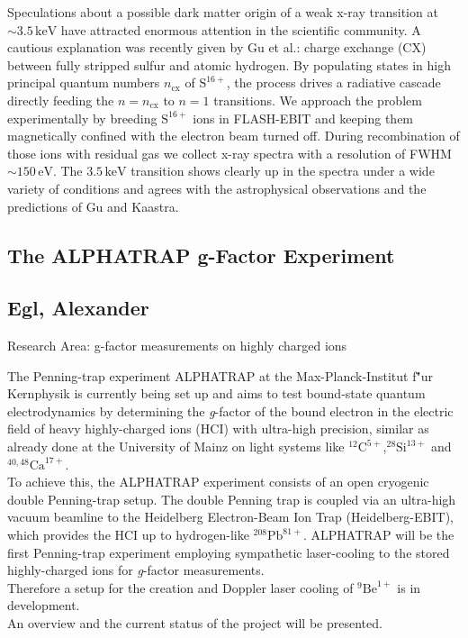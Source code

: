 \noindent Speculations about a possible dark matter origin of a weak x-ray transition at $\sim 3.5\,\mathrm{keV}$ have attracted enormous attention in the scientific community. A cautious explanation was recently given by Gu et al.: charge exchange (CX) between fully stripped sulfur and atomic hydrogen.
By populating states in high principal quantum numbers $n_{\mathrm{cx}}$ of $\mathrm{S}^{16+}$, the process drives a radiative cascade directly feeding the $n = n_{\mathrm{cx}}$ to $n = 1$ transitions. We approach the problem experimentally by breeding $\mathrm{S}^{16+}$ ions in FLASH-EBIT and keeping them magnetically confined with the electron beam turned off. During recombination of those ions with residual gas we collect x-ray spectra with a resolution of FWHM $\sim 150\,\mathrm{eV}$. The $3.5\,\mathrm{keV}$ transition shows clearly up in the spectra under a wide variety of conditions and agrees with the astrophysical observations and the predictions of Gu and Kaastra.

\subsection*{\centering \large The ALPHATRAP g-Factor Experiment}
\subsection*{\centering \normalsize Egl, Alexander}
Research Area: g-factor measurements on highly charged ions\newline

\noindent The Penning-trap experiment ALPHATRAP at the Max-Planck-Institut f\""ur Kernphysik is currently being set up and aims to test bound-state quantum electrodynamics by determining the \textit{g}-factor of the bound electron in the electric field of heavy highly-charged ions (HCI) with ultra-high precision, similar as already done at the University of Mainz on light systems like $^{12}\textrm{C}^{5+}$,$^{28}\textrm{Si}^{13+}$ and $^{40,48}\textrm{Ca}^{17+}$. \\To achieve this, the ALPHATRAP experiment consists of an open cryogenic double Penning-trap setup. The double Penning trap is coupled via an ultra-high vacuum beamline to the Heidelberg Electron-Beam Ion Trap (Heidelberg-EBIT), which provides the HCI up to hydrogen-like $^{208}\textrm{Pb}^{81+}$. ALPHATRAP will be the first Penning-trap experiment employing sympathetic laser-cooling to the stored highly-charged ions for \textit{g}-factor measurements.\\Therefore a setup for the creation and Doppler laser cooling of $^{9}\textrm{Be}^{1+}$ is in development.\\An overview and the current status of the project will be presented.

